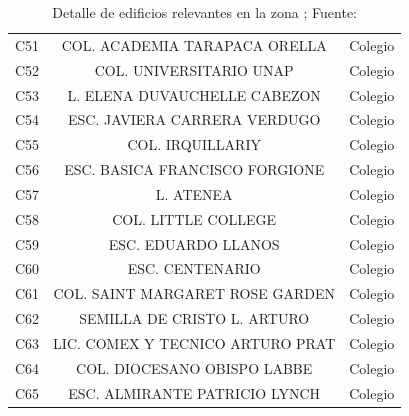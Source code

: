 \documentclass[12pt,a4paper]{article}
\begin{document}
\begin{table}[h!]
\begin{tabular}{|c|c|c|}
C51    & COL. ACADEMIA TARAPACA ORELLA    & Colegio     \\  
C52    & COL. UNIVERSITARIO UNAP          & Colegio     \\  
C53    & L. ELENA DUVAUCHELLE CABEZON     & Colegio     \\  
C54    & ESC. JAVIERA CARRERA VERDUGO     & Colegio     \\  
C55    & COL. IRQUILLARIY                 & Colegio     \\  
C56    & ESC. BASICA FRANCISCO FORGIONE   & Colegio     \\  
C57    & L. ATENEA                        & Colegio     \\  
C58    & COL. LITTLE COLLEGE              & Colegio     \\  
C59    & ESC. EDUARDO LLANOS              & Colegio     \\  
C60    & ESC. CENTENARIO                  & Colegio     \\  
C61    & COL. SAINT MARGARET ROSE GARDEN  & Colegio     \\  
C62    & SEMILLA DE CRISTO L. ARTURO      & Colegio     \\  
C63    & LIC. COMEX Y TECNICO ARTURO PRAT & Colegio     \\  
C64    & COL. DIOCESANO OBISPO LABBE      & Colegio     \\  
C65    & ESC. ALMIRANTE PATRICIO LYNCH    & Colegio     \\  \hline
\end{tabular}
	\caption {Detalle de edificios relevantes en la zona ; Fuente: \citep{CENSO2017}}
	\label{tab3}
\end{table}



\end{document}

